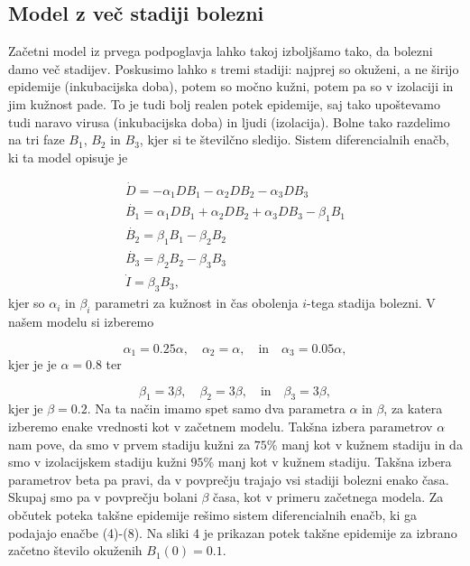 \documentclass[slovene,11pt,a4paper]{article}
\begin{document}
\subsection{Model z več stadiji bolezni}

Začetni model iz prvega podpoglavja lahko takoj izboljšamo tako, da bolezni damo več stadijev. Poskusimo lahko s tremi stadiji: najprej so okuženi, a ne širijo epidemije (inkubacijska doba), potem so močno kužni, potem pa so v izolaciji in jim kužnost pade. To je tudi bolj realen potek epidemije, saj tako upoštevamo tudi naravo virusa (inkubacijska doba) in ljudi (izolacija). Bolne tako razdelimo na tri faze $B_1$, $B_2$ in $B_3$, kjer si te številčno sledijo. Sistem diferencialnih enačb, ki ta model opisuje je

\begin{align}
\dot{D} = -\alpha_1 D B_1 -\alpha_2 D B_2 -\alpha_3 D B_3 \\
\dot{B_1} = \alpha_1 D B_1 + \alpha_2 D B_2 + \alpha_3 D B_3 - \beta_1 B_1 \\
\dot{B_2} = \beta_1 B_1 - \beta_2 B_2 \\
\dot{B_3} = \beta_2 B_2 - \beta_3 B_3 \\
\dot{I} = \beta_3 B_3, 
\end{align}
kjer so $\alpha_i$ in $\beta_i$ parametri za kužnost in čas obolenja $i$-tega stadija bolezni. V našem modelu si izberemo

\[
\alpha_1 = 0.25 \alpha, \quad \alpha_2 = \alpha, \quad \text{in} \quad \alpha_3 = 0.05 \alpha,
\]
kjer je je $\alpha = 0.8$ ter

\[
\beta_1 = 3 \beta, \quad \beta_2 = 3\beta, \quad \text{in} \quad \beta_3 = 3 \beta,
\]
kjer je $\beta = 0.2$. Na ta način imamo spet samo dva parametra $\alpha$ in $\beta$, za katera izberemo enake vrednosti kot v začetnem modelu. Takšna izbera parametrov $\alpha$ nam pove, da smo v prvem stadiju kužni za $75\%$ manj kot v kužnem stadiju in da smo v izolacijskem stadiju kužni $95\%$ manj kot v kužnem stadiju. Takšna izbera parametrov beta pa pravi, da v povprečju trajajo vsi stadiji bolezni enako časa. Skupaj smo pa v povprečju bolani $\beta$ časa, kot v primeru začetnega modela. Za občutek poteka takšne epidemije rešimo sistem diferencialnih enačb, ki ga podajajo enačbe (4)-(8). Na sliki 4 je prikazan potek takšne epidemije za izbrano začetno število okuženih $B_1(0) = 0.1$.
\end{document}
